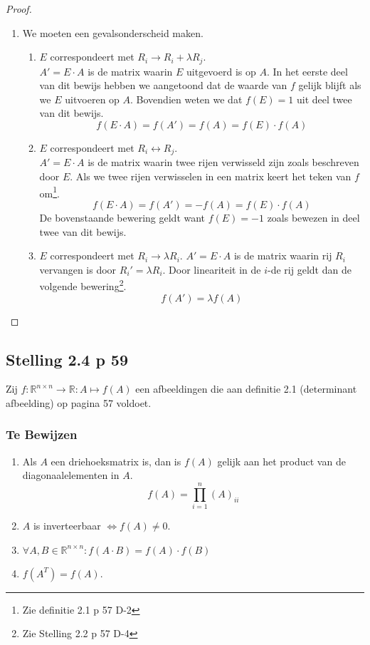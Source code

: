 \documentclass[lineaire_algebra_oplossingen.tex]{subfiles}
\begin{document}
\begin{proof}
\begin{enumerate}
\item
We moeten een gevalsonderscheid maken.
\begin{enumerate}
\item $E$ correspondeert met  $R_i \rightarrow R_i + \lambda R_j$.\\
$A' = E\cdot A$ is de matrix waarin $E$ uitgevoerd is op $A$. In het eerste deel van dit bewijs hebben we aangetoond dat de waarde van $f$ gelijk blijft als we $E$ uitvoeren op $A$. Bovendien weten we dat $f(E)=1$ uit deel twee van dit bewijs.
\[
f(E\cdot A) = f(A') = f(A) = f(E)\cdot f(A)
\]
\item $E$ correspondeert met  $R_i \leftrightarrow R_j$.\\
$A' = E\cdot A$ is de matrix waarin twee rijen verwisseld zijn zoals beschreven door $E$. Als we twee rijen verwisselen in een matrix keert het teken van $f$ om\footnote{Zie definitie 2.1 p 57 D-2}.
\[
f(E\cdot A) = f(A') = -f(A) = f(E)\cdot f(A)
\]
De bovenstaande bewering geldt want $f(E) = -1$ zoals bewezen in deel twee van dit bewijs.
\item $E$ correspondeert met $R_i \rightarrow \lambda R_i$.
$A' = E\cdot A$ is de matrix waarin rij $R_i$ vervangen is door $R_i' = \lambda R_i$. Door lineariteit in de $i$-de rij geldt dan de volgende bewering\footnote{Zie Stelling 2.2 p 57 D-4}.
\[
f(A') = \lambda f(A)
\]
\end{enumerate}
\end{enumerate}
\end{proof}


\subsection{Stelling 2.4 p 59}
\label{2.4}
Zij $f : \mathbb{R}^{n\times n} \rightarrow \mathbb{R}:A\mapsto f(A)$ een afbeeldingen die aan definitie 2.1 (determinant afbeelding) op pagina 57 voldoet.

\subsubsection*{Te Bewijzen}
\begin{enumerate}
\item Als $A$ een driehoeksmatrix is, dan is $f(A)$ gelijk aan het product van de diagonaalelementen in $A$.
\[
f(A) = \prod_{i=1}^n (A)_{ii}
\]
\item $A$ is inverteerbaar $\Leftrightarrow f(A) \neq 0$.
\item $\forall A,B \in \mathbb{R}^{n\times n}: f(A\cdot B) = f(A)\cdot f(B)$
\item $f(A^T) = f(A)$.
\end{enumerate}
\end{document}
